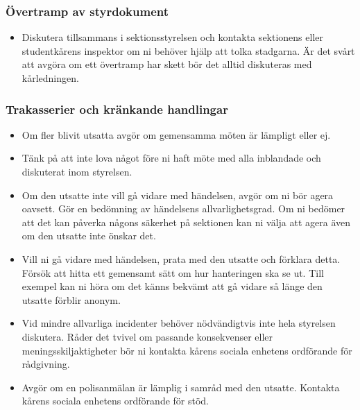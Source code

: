 \documentclass[a4paper]{dtek}
\begin{document}
\subsubsection{Övertramp av styrdokument}
\begin{itemize}
    \item Diskutera tillsammans i sektionsstyrelsen och kontakta sektionens eller studentkårens inspektor om ni behöver hjälp att tolka stadgarna. Är det svårt att avgöra om ett övertramp har skett bör det alltid diskuteras med kårledningen. 
\end{itemize}

\subsubsection{Trakasserier och kränkande handlingar}
\begin{itemize}
    \item Om fler blivit utsatta avgör om gemensamma möten är lämpligt eller ej. 
    \item Tänk på att inte lova något före ni haft möte med alla inblandade och diskuterat inom styrelsen.
    \item Om den utsatte inte vill gå vidare med händelsen, avgör om ni bör agera oavsett. Gör en bedömning av händelsens allvarlighetsgrad. Om ni bedömer att det kan påverka någons säkerhet på sektionen kan ni välja att agera även om den utsatte inte önskar det.
    \item Vill ni gå vidare med händelsen, prata med den utsatte och förklara detta. Försök att hitta ett gemensamt sätt om hur hanteringen ska se ut. Till exempel kan ni höra om det känns bekvämt att gå vidare så länge den utsatte förblir anonym.
    \item Vid mindre allvarliga incidenter behöver nödvändigtvis inte hela styrelsen diskutera. Råder det tvivel om passande konsekvenser eller meningsskiljaktigheter bör ni kontakta kårens sociala enhetens ordförande för rådgivning.
    \item Avgör om en polisanmälan är lämplig i samråd med den utsatte. Kontakta kårens sociala enhetens ordförande för stöd. 
\end{itemize}
\end{document}
